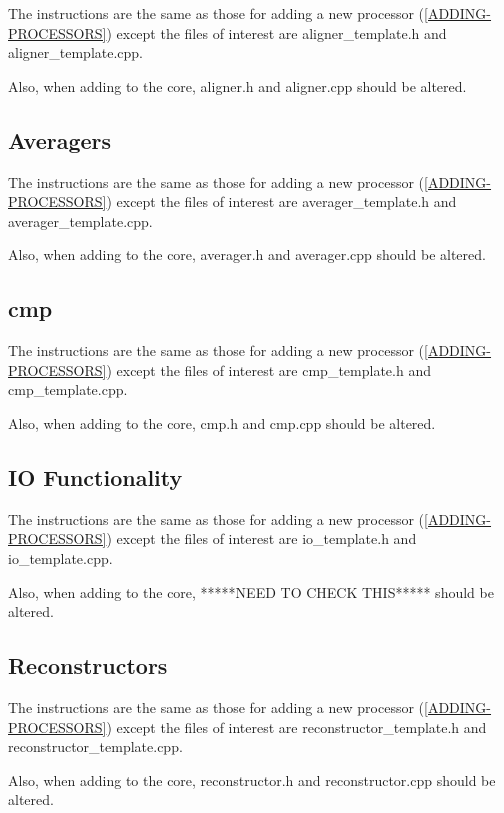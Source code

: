   The instructions are the same as those for adding a new processor
  (\ref{ADDING-PROCESSORS}) except the files of interest are
  aligner_template.h and aligner_template.cpp.

  Also, when adding to the core, aligner.h and aligner.cpp should be altered.

\subsection{Averagers}
  \label{ADDING-AVERAGERS}

  The instructions are the same as those for adding a new processor
  (\ref{ADDING-PROCESSORS}) except the files of interest are
  averager_template.h and averager_template.cpp.

  Also, when adding to the core, averager.h and averager.cpp should be altered.

\subsection{cmp}
  \label{ADDING-CMP} 

  The instructions are the same as those for adding a new processor
  (\ref{ADDING-PROCESSORS}) except the files of interest are
  cmp_template.h and cmp_template.cpp.

  Also, when adding to the core, cmp.h and cmp.cpp should be altered.


\subsection{IO Functionality}
  \label{ADDING-IO} 

  The instructions are the same as those for adding a new processor
  (\ref{ADDING-PROCESSORS}) except the files of interest are
  io_template.h and io_template.cpp.

  Also, when adding to the core, *****NEED TO CHECK THIS***** should be altered.


\subsection{Reconstructors}
  \label{ADDING-RECONSTRUCTORS} 
  
  The instructions are the same as those for adding a new processor
  (\ref{ADDING-PROCESSORS}) except the files of interest are
  reconstructor_template.h and reconstructor_template.cpp.

  Also, when adding to the core, reconstructor.h and reconstructor.cpp should be altered.
